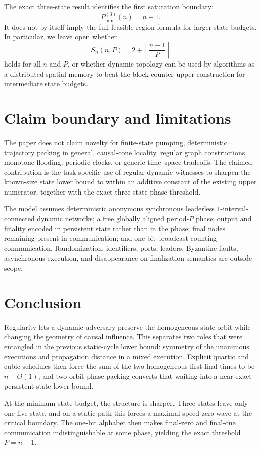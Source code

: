 \documentclass[11pt]{article}
\theoremstyle{remark}
\begin{document}
The exact three-state result identifies the first saturation boundary:
\[
P_{\min}^{(3)}(n)=n-1.
\]
It does not by itself imply the full feasible-region formula for larger state budgets.
In particular, we leave open whether
\[
S_n(n,P)=2+\left\lceil\frac{n-1}{P}\right\rceil
\]
holds for all $n$ and $P$, or whether dynamic topology can be used by algorithms as a
distributed spatial memory to beat the block-counter upper construction for intermediate
state budgets.

\section{Claim boundary and limitations}

The paper does not claim novelty for finite-state pumping, deterministic trajectory
packing in general, causal-cone locality, regular graph constructions, monotone flooding,
periodic clocks, or generic time--space tradeoffs.  The claimed contribution is the
task-specific use of regular dynamic witnesses to sharpen the known-size state lower bound
to within an additive constant of the existing upper numerator, together with the exact
three-state phase threshold.

The model assumes deterministic anonymous synchronous leaderless
$1$-interval-connected dynamic networks; a free globally aligned period-$P$ phase; output
and finality encoded in persistent state rather than in the phase; final nodes remaining
present in communication; and one-bit broadcast-counting communication.  Randomization,
identifiers, ports, leaders, Byzantine faults, asynchronous execution, and
disappearance-on-finalization semantics are outside scope.

\section{Conclusion}

Regularity lets a dynamic adversary preserve the homogeneous state orbit while changing
the geometry of causal influence.  This separates two roles that were entangled in the
previous static-cycle lower bound: symmetry of the unanimous executions and propagation
distance in a mixed execution.  Explicit quartic and cubic schedules then force the sum of
the two homogeneous first-final times to be $n-O(1)$, and two-orbit phase packing converts
that waiting into a near-exact persistent-state lower bound.

At the minimum state budget, the structure is sharper.  Three states leave only one live
state, and on a static path this forces a maximal-speed zero wave at the critical boundary.
The one-bit alphabet then makes final-zero and final-one communication indistinguishable at
some phase, yielding the exact threshold $P=n-1$.
\end{document}
